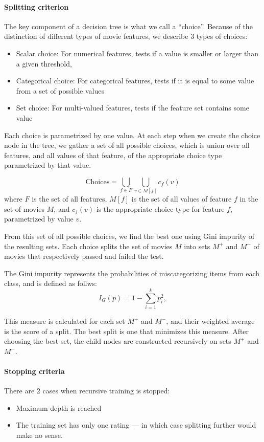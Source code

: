 \documentclass[a4paper,9pt]{article}
\begin{document}
\paragraph{Splitting criterion}
The key component of a decision tree is what we call a ``choice''. Because of the distinction of different types of movie features, we describe 3 types of choices:
\begin{itemize}
	\item Scalar choice: For numerical features, tests if a value is smaller or larger than a given threshold,
	\item Categorical choice: For categorical features, tests if it is equal to some value from a set of possible values
	\item Set choice: For multi-valued features, tests if the feature set contains some value
\end{itemize}

Each choice is parametrized by one value. At each step when we create the choice node in the tree, we gather a set of all possible choices, which is union over all features, and all values of that feature, of the appropriate choice type parametrized by that value.

\begin{equation}
	\text{Choices} = \bigcup\limits_{f \in F} \bigcup\limits_{v \in M[f]} c_f(v)
\end{equation}
where $F$ is the set of all features, $M[f]$ is the set of all values of feature $f$ in the set of movies $M$,
and $c_f(v)$ is the appropriate choice type for feature $f$, parametrized by value $v$.

From this set of all possible choices, we find the best one using Gini impurity of the resulting sets.
Each choice splits the set of movies $M$ into sets $M^+$ and $M^-$ of movies that respectively passed and failed the test.

The Gini impurity represents the probabilities of miscategorizing items from each class, and is defined as follws:
\begin{equation}
	I_G(p) = 1 - \sum_{i=1}^{k} p_i^2,
\end{equation}

This measure is calculated for each set $M^+$ and $M^-$, and their weighted average is the score of a split.
The best split is one that minimizes this measure.
After choosing the best set, the child nodes are constructed recursively on sets $M^+$ and $M^-$.

\paragraph{Stopping criteria}
There are 2 cases when recursive training is stopped:
\begin{itemize}
	\item Maximum depth is reached
	\item The training set has only one rating --- in which case splitting further would make no sense.
\end{itemize}
\end{document}
